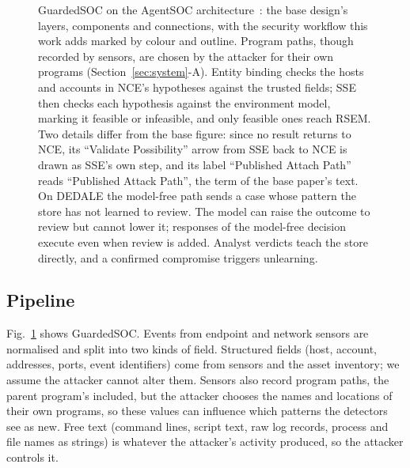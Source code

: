 \documentclass[conference]{IEEEtran}
\begin{document}
\begin{figure}[!t]
\caption{GuardedSOC on the AgentSOC architecture~\cite{agentsoc}: the base design's layers, components and connections, with the security workflow this work adds marked by colour and outline. Program paths, though recorded by sensors, are chosen by the attacker for their own programs (Section~\ref{sec:system}-A). Entity binding checks the hosts and accounts in NCE's hypotheses against the trusted fields; SSE then checks each hypothesis against the environment model, marking it feasible or infeasible, and only feasible ones reach RSEM. Two details differ from the base figure: since no result returns to NCE, its ``Validate Possibility'' arrow from SSE back to NCE is drawn as SSE's own step, and its label ``Published Attach Path'' reads ``Published Attack Path'', the term of the base paper's text. On DEDALE the model-free path sends a case whose pattern the store has not learned to review. The model can raise the outcome to review but cannot lower it; responses of the model-free decision execute even when review is added. Analyst verdicts teach the store directly, and a confirmed compromise triggers unlearning.}
\label{fig:system}
\end{figure}

\subsection{Pipeline}
Fig.~\ref{fig:system} shows GuardedSOC. Events from endpoint and network sensors are normalised and split into
two kinds of field. Structured fields (host, account, addresses, ports, event identifiers) come from sensors and
the asset inventory; we assume the attacker cannot alter them. Sensors also record program paths, the parent
program's included, but the attacker chooses the names and locations of their own programs, so these values can
influence which patterns the detectors see as new. Free text (command lines, script text, raw log records, process
and file names as strings) is whatever the attacker's activity produced, so the attacker controls it.
\end{document}
